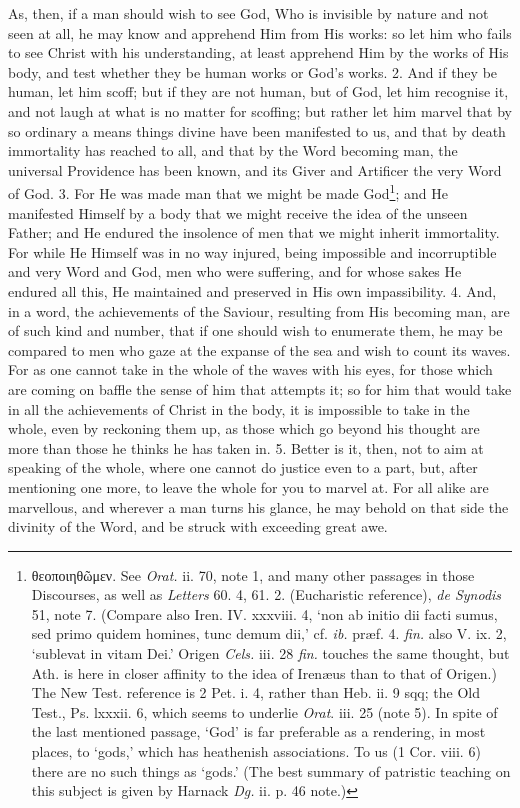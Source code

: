 As, then, if a man should wish to see God, Who is invisible by nature and not seen at all, he may know and apprehend Him from His works: so let him who fails to see Christ with his understanding, at least apprehend Him by the works of His body, and test whether they be human works or God’s works. 2. And if they be human, let him scoff; but if they are not human, but of God, let him recognise it, and not laugh at what is no matter for scoffing; but rather let him marvel that by so ordinary a means things divine have been manifested to us, and that by death immortality has reached to all, and that by the Word becoming man, the universal Providence has been known, and its Giver and Artificer the very Word of God. 3. For He was made man that we might be made God\footnote{\textgreek{θεοποιηθῶμεν}. See \emph{Orat.} ii. 70, note 1, and many other passages in those Discourses, as well as \emph{Letters} 60. 4, 61. 2. (Eucharistic reference), \emph{de Synodis} 51, note 7. (Compare also Iren. IV. xxxviii. 4, ‘non ab initio dii facti sumus, sed primo quidem homines, tunc demum dii,’ cf. \emph{ib.} præf. 4. \emph{fin.} also V. ix. 2, ‘sublevat in vitam Dei.’ Origen \emph{Cels.} iii. 28 \emph{fin.} touches the same thought, but Ath. is here in closer affinity to the idea of Irenæus than to that of Origen.) The New Test. reference is 2 Pet. i. 4, rather than Heb. ii. 9 sqq; the Old Test., Ps. lxxxii. 6, which seems to underlie \emph{Orat}. iii. 25 (note 5). In spite of the last mentioned passage, ‘God’ is far preferable as a rendering, in most places, to ‘gods,’ which has heathenish associations. To us (1 Cor. viii. 6) there are no such things as ‘gods.’ (The best summary of patristic teaching on this subject is given by Harnack \emph{Dg.} ii. p. 46 note.)}; and He manifested Himself by a body that we might receive the idea of the unseen Father; and He endured the insolence of men that we might inherit immortality. For while He Himself was in no way injured, being impossible and incorruptible and very Word and God, men who were suffering, and for whose sakes He endured all this, He maintained and preserved in His own impassibility. 4. And, in a word, the achievements of the Saviour, resulting from His becoming man, are of such kind and number, that if one should wish to enumerate them, he may be compared to men who gaze at the expanse of the sea and wish to count its waves. For as one cannot take in the whole of the waves with his eyes, for those which are coming on baffle the sense of him that attempts it; so for him that would take in all the achievements of Christ in the body, it is impossible to take in the whole, even by reckoning them up, as those which go beyond his thought are more than those he thinks he has taken in. 5. Better is it, then, not to aim at speaking of the whole, where one cannot do justice even to a part, but, after mentioning one more, to leave the whole for you to marvel at. For all alike are marvellous, and wherever a man turns his glance, he may behold on that side the divinity of the Word, and be struck with exceeding great awe.

